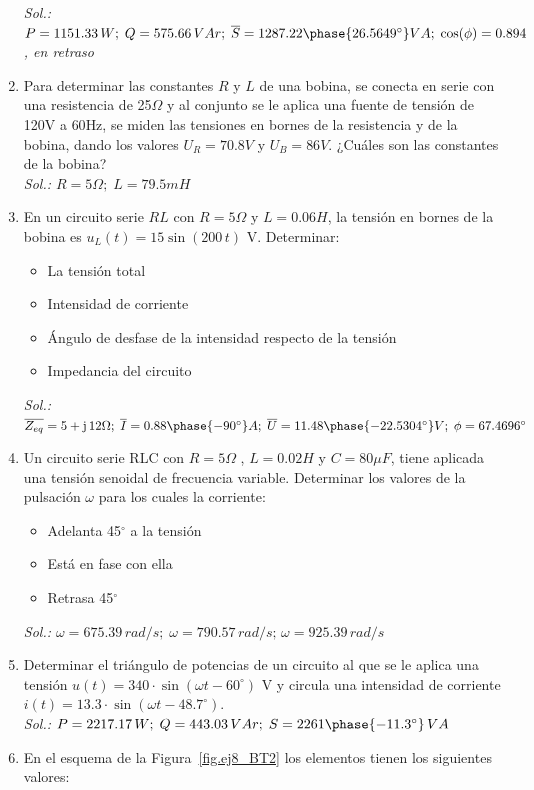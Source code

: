 \begin{enumerate}
    \emph{Sol.: $P=1151.33 \,W;\; Q=575.66 \,VAr;\; \overline{S}=1287.22\phase{26.5649^\circ} VA;\; \cos(\phi)=0.894$, en retraso}
    \item Para determinar las constantes $R$ y $L$ de una bobina, se conecta en serie con una resistencia de {25}{$\Omega$} y al conjunto se le aplica una fuente de tensión de {120}{V} a {60}{Hz}, se miden las tensiones en bornes de la resistencia y de la bobina, dando los valores $U_R = {70.8}{V}$ y $U_B = {86}{V}$. ¿Cuáles son las constantes de la bobina?\\
    \emph{Sol.: $R= 5{\Omega};\; L = {79.5}mH$}
    \item En un circuito serie $RL$ con $R=5\Omega$ y $L=0.06H$, la tensión en bornes de la bobina es $u_L(t)=15\sin(200\,t)$ V. Determinar:
    \begin{itemize}
        \item La tensión total
        \item Intensidad de corriente
        \item Ángulo de desfase de la intensidad respecto de la tensión
        \item Impedancia del circuito
    \end{itemize}
    \emph{Sol.: $\overline{Z_{eq}}=5+\mathrm{j}\,12\Omega;\;\overline{I}=0.88\phase{-90^\circ}A;\;\overline{U}=11.48\phase{-22.5304^\circ} V;\; \phi=67.4696^\circ$}
    \item Un circuito serie RLC con $R = {5}{\Omega}$ , $L = {0.02}{H}$ y $C={80}{\mu F}$, tiene aplicada una tensión senoidal de frecuencia variable. Determinar los valores de la pulsación $\omega$ para los cuales la corriente:
\begin{itemize}
\item Adelanta {45}{$^\circ$} a la tensión
\item Está en fase con ella
\item Retrasa {45}{$^\circ$}
\end{itemize}
\emph{Sol.: $\omega=675.39\,rad/s;\; \omega=790.57\,rad/s;\, \omega=925.39\,rad/s$}
\item Determinar el triángulo de potencias de un circuito al que se le aplica una tensión $u(t)=340 \cdot \sin(\omega t - 60^\circ)$ V y circula una intensidad de corriente $i(t)= 13.3 \cdot \sin(\omega t-48.7^\circ)$.\\
\emph{Sol.: $P=2217.17\,W;\;Q=443.03\,VAr;\;S=2261\phase{-11.3^\circ}\,VA$}
\item En el esquema de la Figura~\ref{fig.ej8_BT2} los elementos tienen los siguientes valores:

\end{enumerate}
